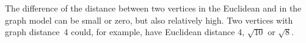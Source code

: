 \documentclass[smallextended]{svjour3}
\begin{document}
\begin{comment} 
\subsection*{Hexagonal lattice: } 
0($-\frac{\sqrt{3}}{2},+\frac{3}{2}$), 1($+\frac{\sqrt{3}}{2},+\frac{3}{2}$), 
2($-\sqrt{3},+1$), 3($0,1$), 4($+\sqrt{3},+1$), 5($-\sqrt{3},0$), 
6($0,0$), 7($+\sqrt{3},0$), 8($-\frac{3\cdot\sqrt{3}}{2},-\frac{1}{2}$), 
9($-\frac{\sqrt{3}}{2},-\frac{1}{2}$), 10($+\frac{\sqrt{3}}{2},-\frac{1}{2}$), 
11($+\frac{3\cdot\sqrt{3}}{2},-\frac{1}{2}$), 12($-\frac{3\cdot\sqrt{3}}{2},-\frac{3}{2}$), 
13($-\frac{\sqrt{3}}{2},-\frac{3}{2}$), 14($+\frac{\sqrt{3}}{2},-\frac{3}{2}$), 
15($+\frac{3\cdot\sqrt{3}}{2},-\frac{3}{2}$), 16($-\sqrt{3},-2$), 
17($0,-2$), 18($+\sqrt{3},-2$), 19($-\sqrt{3},-3$), 20($0,-3$), 
21($+\sqrt{3},-3$), 22($-\frac{\sqrt{3}}{2},-\frac{7}{2}$), 23($+\frac{\sqrt{3}}{2},-\frac{7}{2}$) 
\subsection*{Square lattice:} 
0($-2,+2$), 1($-1,+2$), 2($0,+2$), 3($+1,+2$), 4($+2,+2$), 5($-2,+1$), 
6($-1,+1$), 7($0,+1$), 8($+1,+1$), 9($+2,+1$), 10($-2,0$), 11($-1,0$), 
12($0,0$), 13($+1,0$), 14($+2,0$), 15($-2,-1$), 16($-1,-1$), 
17($0,-1$), 18($+1,-1$), 19($+2,-1$), 20($-2,-2$), 21($-1,-2$), 
22($0,-2$), 23($+1,-2$), 24($+2,-2$) 
\subsection*{Triangular lattice:} 
c, 3($+3,0$), 4($+4,0$), 5($+\frac{1}{2},+\frac{\sqrt{3}}{2}$), 
6($+\frac{3}{2},+\frac{\sqrt{3}}{2}$), 7($+\frac{5}{2},+\frac{\sqrt{3}}{2}$), 
8($+\frac{7}{2},+\frac{\sqrt{3}}{2}$), 9($0,+\sqrt{3}$), 10($+1,+\sqrt{3}$), 
11($+2,+\sqrt{3}$), 12($+3,+\sqrt{3}$), 13($+4,+\sqrt{3}$), 14($+\frac{1}{2},+\frac{3\cdot\sqrt{3}}{2}$), 
15($+\frac{3}{2},+\frac{3\cdot\sqrt{3}}{2}$), 16($+\frac{5}{2},+\frac{3\cdot\sqrt{3}}{2}$), 
17($+\frac{7}{2},+\frac{3\cdot\sqrt{3}}{2}$), 18($0,+2\cdot\sqrt{3}$), 
19($+1,+2\cdot\sqrt{3}$), 20($+2,+2\cdot\sqrt{3}$), 21($+3,+2\cdot\sqrt{3}$), 
22($+4,+2\cdot\sqrt{3}$) 
\end{comment} 


The difference of the distance between two vertices in the Euclidean and in the 
graph model can be small or zero, but also relatively high. 
Two vertices with graph distance~4 could, for example, have Euclidean distance 4, 
$\sqrt{10}$ or $\sqrt{8}$. 
\end{document}
